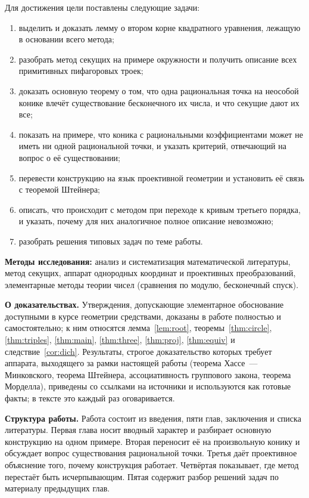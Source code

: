 \documentclass[a4paper,14pt]{extreport}
\theoremstyle{definition}
\begin{document}
Для достижения цели поставлены следующие задачи:

\begin{enumerate}[leftmargin=*,topsep=2pt,itemsep=1pt]
\item выделить и доказать лемму о втором корне квадратного уравнения, лежащую
      в основании всего метода;
\item разобрать метод секущих на примере окружности и получить описание всех
      примитивных пифагоровых троек;
\item доказать основную теорему о том, что одна рациональная точка на неособой
      конике влечёт существование бесконечного их числа, и что секущие дают их все;
\item показать на примере, что коника с рациональными коэффициентами может не
      иметь ни одной рациональной точки, и указать критерий, отвечающий на вопрос
      о её существовании;
\item перевести конструкцию на язык проективной геометрии и установить её связь
      с теоремой Штейнера;
\item описать, что происходит с методом при переходе к кривым третьего порядка,
      и указать, почему для них аналогичное полное описание невозможно;
\item разобрать решения типовых задач по теме работы.
\end{enumerate}

\textbf{Методы исследования:} анализ и систематизация математической литературы,
метод секущих, аппарат однородных координат и проективных преобразований,
элементарные методы теории чисел (сравнения по модулю, бесконечный спуск).

\textbf{О доказательствах.} Утверждения, допускающие элементарное обоснование
доступными в курсе геометрии средствами, доказаны в работе полностью и
самостоятельно; к ним относятся лемма~\ref{lem:root}, теоремы~\ref{thm:circle},
\ref{thm:triples}, \ref{thm:main}, \ref{thm:three}, \ref{thm:proj},
\ref{thm:equiv} и следствие~\ref{cor:dich}. Результаты, строгое доказательство
которых требует аппарата, выходящего за рамки настоящей работы (теорема
Хассе~--- Минковского, теорема Штейнера, ассоциативность группового закона,
теорема Морделла), приведены со ссылками на источники и используются
как готовые факты; в тексте это каждый раз оговаривается.

\textbf{Структура работы.} Работа состоит из введения, пяти глав, заключения и
списка литературы. Первая глава носит вводный характер и разбирает основную
конструкцию на одном примере. Вторая переносит её на произвольную конику и
обсуждает вопрос существования рациональной точки. Третья даёт проективное
объяснение того, почему конструкция работает. Четвёртая показывает, где метод
перестаёт быть исчерпывающим. Пятая содержит разбор решений задач по материалу
предыдущих глав.
\end{document}
